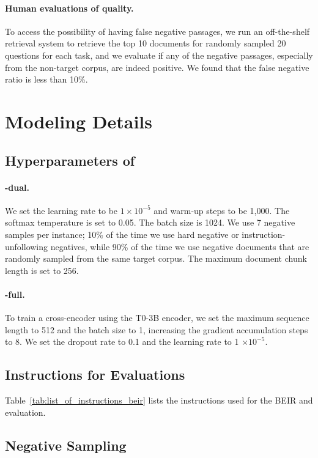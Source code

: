 \paragraph{Human evaluations of quality. }
{To access the possibility of having false negative passages, we run an off-the-shelf retrieval system to retrieve the top 10 documents for randomly sampled 20 questions for each task, and we evaluate if any of the negative passages, especially from the non-target corpus, are indeed positive. 
We found that the false negative ratio is less than 10\%. }


\section{Modeling Details}
\subsection{Hyperparameters of \model }
\label{sec:hyperparameters}
\paragraph{\model-dual.}
We set the learning rate to be $1 \times 10^{-5}$ and warm-up steps to be 1,000. The softmax temperature is set to 0.05. 
The batch size is 1024. 
We use 7 negative samples per instance; 10\% of the time we use hard negative or instruction-unfollowing negatives, while 90\% of the time we use negative documents that are randomly sampled from the same target corpus. 
The maximum document chunk length is set to 256. 


\paragraph{\model-full.}
To train a cross-encoder using the T0-3B encoder, we set the maximum sequence length to 512 and the batch size to 1, increasing the gradient accumulation steps to 8. 
We set the dropout rate to 0.1 and the learning rate to 1 $\times 10 ^ {-5}$.  


\subsection{Instructions for Evaluations}
Table~\ref{tab:list_of_instructions_beir} lists the instructions used for the BEIR and \task evaluation. 

\subsection{Negative Sampling}
\label{sec:details_of_negative}
